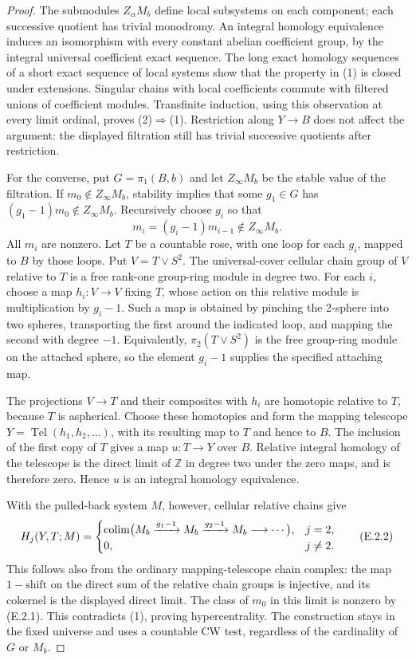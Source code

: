 \begin{proof}
The submodules $Z_\alpha M_b$ define local subsystems on each component;
each successive quotient has trivial monodromy. An integral homology
equivalence induces an isomorphism with every constant abelian
coefficient group, by the integral universal coefficient exact
sequence. The long exact homology sequences of a short exact sequence
of local systems show that the property in (1) is closed under
extensions. Singular chains with local coefficients commute with
filtered unions of coefficient modules. Transfinite induction,
using this observation at every limit ordinal, proves (2)$\Rightarrow$(1).
Restriction along $Y\to B$ does not affect the argument: the displayed
filtration still has trivial successive quotients after restriction.

For the converse, put $G=\pi_1(B,b)$ and let $Z_\infty M_b$ be the
stable value of the filtration. If $m_0\notin Z_\infty M_b$, stability
implies that some $g_1\in G$ has
$(g_1-1)m_0\notin Z_\infty M_b$. Recursively choose $g_i$ so that
\[
             m_i=(g_i-1)m_{i-1}\notin Z_\infty M_b.
             \tag{E.2.1}
\]
All $m_i$ are nonzero. Let $T$ be a countable rose, with one loop for
each $g_i$, mapped to $B$ by those loops. Put $V=T\vee S^2$.
The universal-cover cellular chain group of $V$ relative to $T$ is a
free rank-one group-ring module in degree two. For each $i$, choose
a map $h_i:V\to V$ fixing $T$, whose action on this relative module
is multiplication by $g_i-1$. Such a map is obtained by pinching the
2-sphere into two spheres, transporting the first around the indicated
loop, and mapping the second with degree $-1$. Equivalently,
$\pi_2(T\vee S^2)$ is the free group-ring module on the attached sphere,
so the element $g_i-1$ supplies the specified attaching map.

The projections $V\to T$ and their composites with $h_i$ are homotopic
relative to $T$, because $T$ is aspherical. Choose these homotopies and
form the mapping telescope $Y=\operatorname{Tel}(h_1,h_2,\ldots)$,
with its resulting map to $T$ and hence to $B$. The inclusion of the
first copy of $T$ gives a map $u:T\to Y$ over $B$. Relative integral
homology of the telescope is the direct limit of $\mathbb Z$ in
degree two under the zero maps, and is therefore zero. Hence $u$ is
an integral homology equivalence.

With the pulled-back system $M$, however, cellular relative chains
give
\[
 H_j(Y,T;M)=
 \begin{cases}
 \operatorname*{colim}\bigl(M_b\xrightarrow{g_1-1}M_b
                 \xrightarrow{g_2-1}M_b\longrightarrow\cdots\bigr),&j=2,\\
 0,&j\ne2.
 \end{cases}                                                    \tag{E.2.2}
\]
This follows also from the ordinary mapping-telescope chain complex:
the map $1-\mathrm{shift}$ on the direct sum of the relative chain
groups is injective, and its cokernel is the displayed direct limit.
The class of $m_0$ in this limit is nonzero by (E.2.1). This
contradicts (1), proving hypercentrality. The construction stays in
the fixed universe and uses a countable CW test, regardless of the
cardinality of $G$ or $M_b$.


\end{proof}
